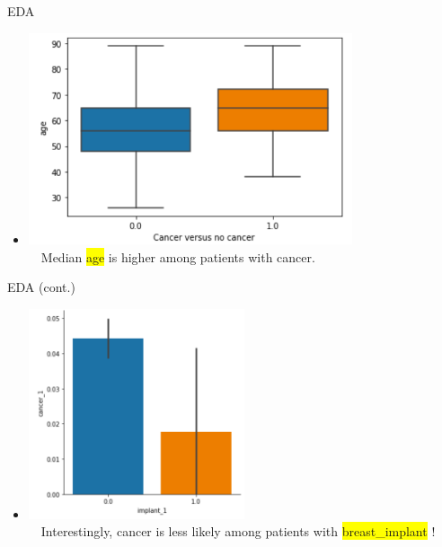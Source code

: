 \documentclass[14pt]{beamer}
\begin{document}
\begin{frame}{\small EDA}
\begin{itemize}
\item \includegraphics[width=0.75\textwidth]{AgeVsCancer}\\~\
Median \colorbox{yellow}{age} is higher among patients with cancer.
\end{itemize}
\end{frame}

\begin{frame}{\small EDA (cont.)}
\begin{itemize}
\item \includegraphics[width=0.5\textwidth]{CancerVsImplant}\\~\
Interestingly, cancer is less likely among patients with \colorbox{yellow}{breast\_implant} !
\end{itemize}
\end{frame}
\end{document}

